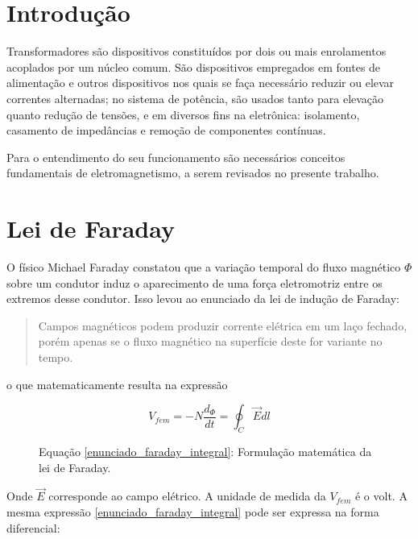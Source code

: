\documentclass[]{report}
\title{}
\begin{document}

\tableofcontents

\chapter*{Introdução}

Transformadores são dispositivos constituídos por dois ou mais enrolamentos acoplados por um núcleo comum. São dispositivos empregados em fontes de alimentação e outros dispositivos nos quais se faça necessário reduzir ou elevar correntes alternadas; no sistema de potência, são usados tanto para elevação quanto redução de tensões, e em diversos fins na eletrônica: isolamento, casamento de impedâncias e  remoção de componentes contínuas.

Para o entendimento do seu funcionamento são necessários conceitos fundamentais de eletromagnetismo, a serem revisados no presente trabalho. 

\chapter{Lei de Faraday}

O físico Michael Faraday constatou que a variação temporal do fluxo magnético $\Phi$ sobre um condutor induz o aparecimento de uma força eletromotriz entre os extremos desse condutor. Isso levou ao enunciado da lei de indução de Faraday:

\begin{quote}
\begin{flushright}
Campos magnéticos podem produzir corrente elétrica em um laço fechado, porém apenas se o fluxo magnético na superfície deste for variante no tempo. \cite{ulaby}
\end{flushright}
\end{quote}
o que matematicamente resulta na expressão

\begin{figure}[!ht]
\begin{equation}
\label{enunciado_faraday_integral}
V_{fem} = -N \frac{d_\Phi}{dt} = \oint_C \vec{E} dl
\end{equation}
\caption*{Equação \ref{enunciado_faraday_integral}: Formulação matemática da lei de Faraday.}
\end{figure}

Onde $\vec{E}$ corresponde ao campo elétrico. A unidade de medida da $V_{fem}$ é o volt. A mesma expressão \ref{enunciado_faraday_integral} pode ser expressa na forma diferencial:
\end{document}
